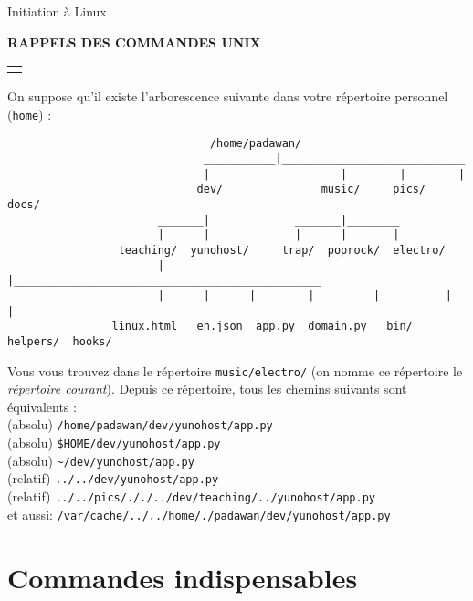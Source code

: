 \documentclass [a4paper]{article}
\newcommand{\bc}{\begin{center}}
\newcommand{\ec}{\end{center}}
\begin{document}
\noindent Initiation à Linux
\bc
 \textbf{RAPPELS DES COMMANDES UNIX} \\
\ec


\noindent\begin{tabular}{p{17.2cm}}
 \hline
 \\
\end{tabular}

On suppose qu'il existe l'arborescence suivante dans votre répertoire personnel (\verb+home+) :

\begin{verbatim}
                               /home/padawan/
                              ___________|____________________________
                              |                    |        |        |
                             dev/               music/     pics/    docs/
                       _______|             _______|________
                       |      |             |      |       |
                 teaching/  yunohost/     trap/  poprock/  electro/
                       |      |_______________________________________________
                       |      |      |        |         |          |         |
                linux.html   en.json  app.py  domain.py   bin/     helpers/  hooks/
\end{verbatim}

Vous vous trouvez dans le répertoire {\verb+music/electro/+} (on nomme ce répertoire
 le {\it répertoire courant}). Depuis ce répertoire, tous les chemins suivants sont équivalents :\\
(absolu)  \verb+/home/padawan/dev/yunohost/app.py+\\
(absolu)  \verb+$HOME/dev/yunohost/app.py+\\
(absolu)  \verb+~/dev/yunohost/app.py+\\
(relatif) \verb+../../dev/yunohost/app.py+\\
(relatif) \verb+../../pics/././../dev/teaching/../yunohost/app.py+\\
et aussi: \verb+/var/cache/../../home/./padawan/dev/yunohost/app.py+\\


\section*{Commandes indispensables}
\end{document}
